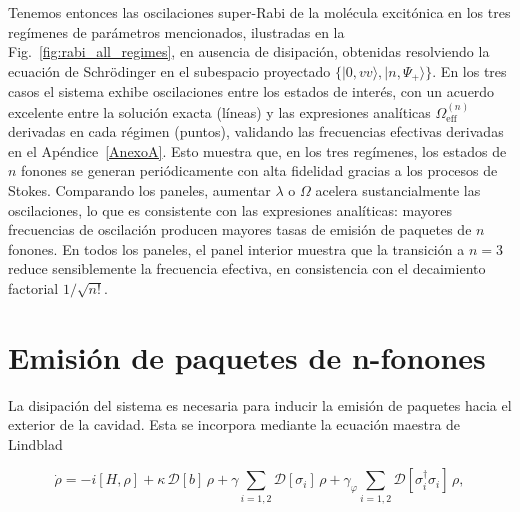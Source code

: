 Tenemos entonces las oscilaciones super-Rabi de la molécula excitónica en los tres regímenes de parámetros mencionados, ilustradas en la Fig.~\ref{fig:rabi_all_regimes}, en ausencia de disipación, obtenidas resolviendo la ecuación de Schrödinger en el subespacio proyectado $\{|0,vv\rangle, |n,\Psi_+\rangle\}$. En los tres casos el sistema exhibe oscilaciones entre los estados de interés, con un acuerdo excelente entre la solución exacta (líneas) y las expresiones analíticas $\Omega_\mathrm{eff}^{(n)}$ derivadas en cada régimen (puntos), validando las frecuencias efectivas derivadas en el Apéndice~\ref{AnexoA}. Esto muestra que, en los tres regímenes, los estados de $n$ fonones se generan periódicamente con alta fidelidad gracias a los procesos de Stokes. Comparando los paneles, aumentar $\lambda$ o $\Omega$ acelera sustancialmente las oscilaciones, lo que es consistente con las expresiones analíticas: mayores frecuencias de oscilación producen mayores tasas de emisión de paquetes de $n$ fonones. En todos los paneles, el panel interior muestra que la transición a $n=3$ reduce sensiblemente la frecuencia efectiva, en consistencia con el decaimiento factorial $1/\sqrt{n!}$.

\section{Emisión de paquetes de n-fonones}

La disipación del sistema es necesaria para inducir la emisión de paquetes hacia el exterior de la cavidad. Esta se incorpora mediante la ecuación maestra de Lindblad

\begin{equation}
	\dot{\rho} = -i[H,\rho]
	+ \kappa\,\mathcal{D}[b]\,\rho
	+ \gamma\sum_{i=1,2}\mathcal{D}[\sigma_i]\,\rho
	+ \gamma_\varphi\sum_{i=1,2}\mathcal{D}[\sigma_i^\dagger\sigma_i]\,\rho,
	\label{eq:lindblad_resultados}
\end{equation}

